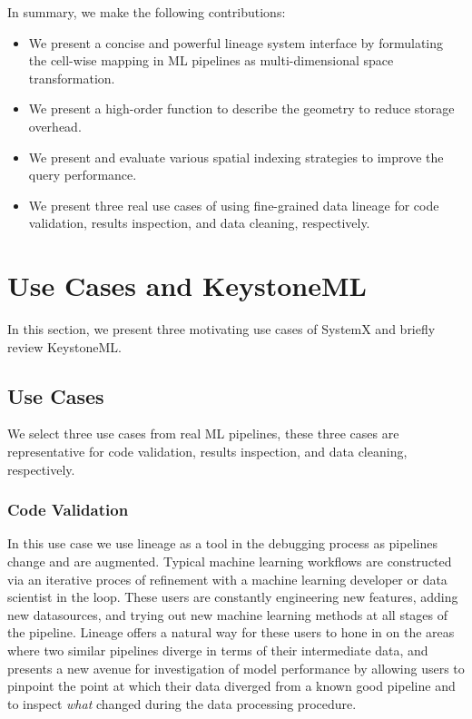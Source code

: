 \documentclass{sig-alternate}
\newenvironment{shortlist}{
        \vspace*{-0.5em}
  \begin{itemize}
  \setlength{\itemsep}{-0.1em}
}{
  \end{itemize}
        \vspace*{-0.5em}
}
\begin{document}
In summary, we make the following contributions:
\begin{shortlist}
\item{} We present a concise and powerful lineage system interface by formulating the cell-wise mapping in ML pipelines as multi-dimensional space transformation.
\item{} We present a high-order function to describe the geometry to reduce storage overhead.
\item{} We present and evaluate various spatial indexing strategies to improve the query performance.
\item{} We present three real use cases of using fine-grained data lineage for code validation, results inspection, and data cleaning, respectively.
\end{shortlist}


\section{Use Cases and K\MakeLowercase{eystone}ML}
\label{sec:Background}
In this section, we present three motivating use cases of SystemX and briefly review KeystoneML.

\subsection{Use Cases}
\label{sec:Back-cases}
We select three use cases from real ML pipelines, these three cases are representative for code validation, results inspection, and data cleaning, respectively.

\subsubsection{Code Validation}
In this use case we use lineage as a tool in the debugging process as pipelines change and are augmented. 
Typical machine learning workflows are constructed via an iterative proces of refinement with a machine learning developer or data scientist in the loop.
These users are constantly engineering new features, adding new datasources, and trying out new machine learning methods at all stages of the pipeline.
Lineage offers a natural way for these users to hone in on the areas where two similar pipelines diverge in terms of their intermediate data, and presents a new avenue for investigation of model performance by allowing users to pinpoint the point at which their data diverged from a known good pipeline and to inspect \emph{what} changed during the data processing procedure. 
\end{document}
